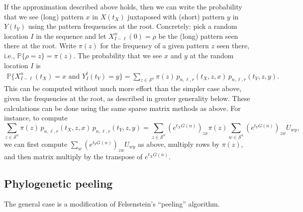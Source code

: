 \documentclass{article}
\renewcommand{\P}{\mathbb{P}}
\newcommand{\calS}{\mathcal{S}}  %
\theoremstyle{plain}
\theoremstyle{definition}
\begin{document}
If the approximation described above holds,
then we can write the probability that we see (long) pattern $x$ in $X(t_X)$ juxtaposed with (short) pattern $y$ in $Y(t_Y)$
using the pattern frequencies at the root.
Concretely: pick a random location $I$ in the sequence and let $X_{I-\ell}^{n}(0) = \rho$ be the (long) pattern seen there at the root.
Write $\pi(z)$ for the frequency of a given pattern $z$ seen there, i.e., $\P\{\rho=z\}=\pi(z)$.
The probability that we see $x$ and $y$ at the random location $I$ is
\begin{align} \label{eqn:phylo_likelihood}
    \P\{X_{I-\ell}^{n}(t_X)=x \text{ and } Y_I^\ell(t_Y)=y \} = \sum_{z \in \calS^{n}} \pi(z) \, p_{n,\ell,r}(t_X,z,x) \, p_{n,\ell,r}(t_Y,z,y) .
\end{align}
This can be computed without much more effort than the simpler case above,
given the frequencies at the root, as described in greater generality below.
These calculations can be done using the same sparse matrix methods as above.
For instance, to compute
\[
    \sum_{z \in \calS^{n}} \pi(z) \, p_{n,\ell,r}(t_X,z,x) \, p_{n,\ell,r}(t_Y,z,y)
    = \sum_{z \in \calS^{n}} \left( e^{t_X G(n)} \right)_{zx} \pi(z) \sum_{w \in \calS^{n}} \left( e^{t_Y G(n)} \right)_{zw} U_{wy} ,
\]
we can first compute $\sum_w \left( e^{t_Y G(n)} \right)_{zw} U_{wy}$ as above,
multiply rows by $\pi(z)$, and then matrix multiply by the transpose of $e^{t_X G(n)}$.




\subsection{Phylogenetic peeling}

The general case is a modification of Felsenstein's ``peeling'' algorithm.
\end{document}
